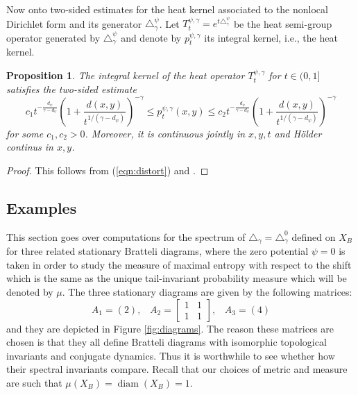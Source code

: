 \documentclass[12pt]{amsart}
\theoremstyle{plain}
\newtheorem{proposition}{Proposition}[section]
\theoremstyle{definition}
\begin{document}
Now onto two-sided estimates for the heat kernel associated to the nonlocal Dirichlet form and its generator $\triangle_\gamma^\psi$. Let $T_t^{\psi,\gamma}=e^{t\triangle^\psi_\gamma}$ be the heat semi-group operator generated by $\triangle^\psi_\gamma$ and denote by $p_t^{\psi,\gamma}$ its integral kernel, i.e., the heat kernel.
\begin{proposition}
The integral kernel of the heat operator $T_t^{\psi,\gamma}$ for $t\in (0,1]$ satisfies the two-sided estimate
$$c_1 t^{-\frac{d_\psi}{\gamma-d_\psi}}\left(1+\frac{d(x,y)}{t^{1/(\gamma-d_\psi)}}\right)^{-\gamma}\leq p_t^{\psi,\gamma}(x,y) \leq    c_2 t^{-\frac{d_\psi}{\gamma-d_\psi}}\left(1+\frac{d(x,y)}{t^{1/(\gamma-d_\psi)}}\right)^{-\gamma}$$
for some $c_1,c_2>0$. Moreover, it is continuous jointly in $x,y,t$ and H\"older continus in $x,y$.
\end{proposition}

\begin{proof}
This follows from  (\ref{eqn:distort}) and \cite[Corollary 2.13]{BGHH:HK}.
\end{proof}

\subsection{Examples}
\label{subsec:examples}
This section goes over computations for the spectrum of $\triangle_\gamma = \triangle^0_\gamma$ defined on $X_B$ for three related stationary Bratteli diagrams, where the zero potential $\psi = 0$ is taken in order to study the measure of maximal entropy with respect to the shift which is the same as the unique tail-invariant probability measure which will be denoted by $\mu$. The three stationary diagrams are given by the following matrices:
$$A_1 = (2),\;\;\;A_2 = \begin{bmatrix} 1&1 \\ 1&1\end{bmatrix},\;\;\;A_3 = (4)$$
and they are depicted in Figure \ref{fig:diagrams}. The reason these matrices are chosen is that they all define Bratteli diagrams with isomorphic topological invariants and conjugate dynamics. Thus it is worthwhile to see whether how their spectral invariants compare. Recall that our choices of metric and measure are such that $\mu(X_B)=\operatorname{diam}(X_B)=1$.
\end{document}
